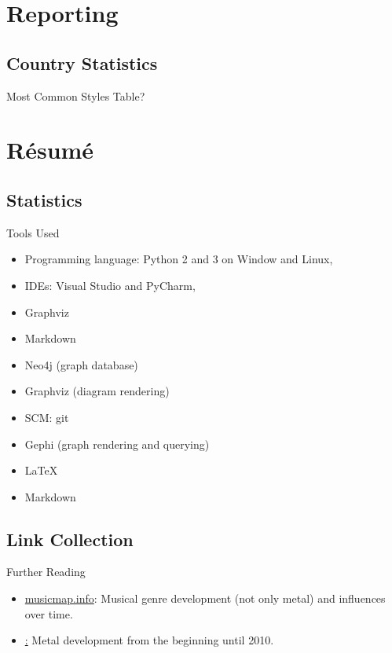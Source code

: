\documentclass{beamer}
\begin{document}

\section{Reporting}

  \subsection{Country Statistics}

    \begin{frame}{Most Common Styles}
      Table?
    \end{frame}

\section{Résumé}

  \subsection{Statistics}

    \begin{frame}{Tools Used}
      \begin{itemize}
        \item<1-> Programming language: Python 2 and 3 on Window and Linux,
        \item<1-> IDEs: Visual Studio and PyCharm,
        \item<1-> Graphviz
        \item<1-> Markdown
        \item<1-> Neo4j (graph database)
        \item<1-> Graphviz (diagram rendering)
        \item<1-> SCM: git
        \item<1-> Gephi (graph rendering and querying)
        \item<1-> \LaTeX{}
        \item<1-> Markdown
      \end{itemize}
    \end{frame}

  \subsection{Link Collection}

    \begin{frame}{Further Reading}
      \begin{itemize}
        \item\href{https://musicmap.info/}{musicmap.info}: Musical genre development (not only metal) and influences over time.
        \item\href{https://www.boundbymetal.com/en/common/metal-genres-graph}: Metal development from the beginning until 2010.
      \end{itemize}
    \end{frame}
\end{document}
